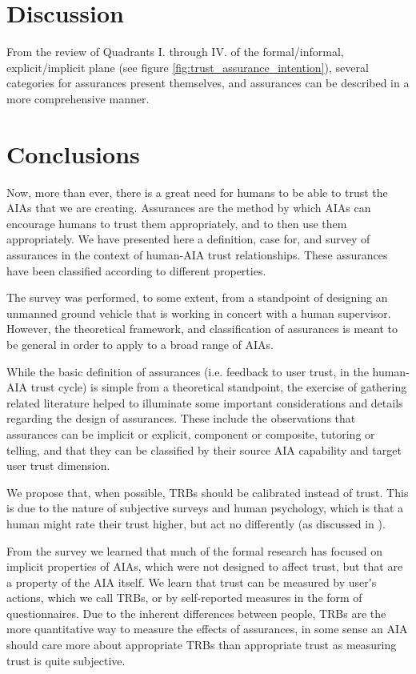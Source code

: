 \section{Discussion}\label{sec:discussion} 
    From the review of Quadrants I. through IV. of the formal/informal, explicit/implicit plane (see figure \ref{fig:trust_assurance_intention}), several categories for assurances present themselves, and assurances can be described in a more comprehensive manner.

    
    

\section{Conclusions}\label{sec:conclusions}
    Now, more than ever, there is a great need for humans to be able to trust the AIAs that we are creating. Assurances are the method by which AIAs can encourage humans to trust them appropriately, and to then use them appropriately. We have presented here a definition, case for, and survey of assurances in the context of human-AIA trust relationships. These assurances have been classified according to different properties.
    
    The survey was performed, to some extent, from a standpoint of designing an unmanned ground vehicle that is working in concert with a human supervisor. However, the theoretical framework, and classification of assurances is meant to be general in order to apply to a broad range of AIAs.

    While the basic definition of assurances (i.e. feedback to user trust, in the human-AIA trust cycle) is simple from a theoretical standpoint, the exercise of gathering related literature helped to illuminate some important considerations and details regarding the design of assurances. These include the observations that assurances can be implicit or explicit, component or composite, tutoring or telling, and that they can be classified by their source AIA capability and target user trust dimension.

    We propose that, when possible, TRBs should be calibrated instead of trust. This is due to the nature of subjective surveys and human psychology, which is that a human might rate their trust higher, but act no differently (as discussed in \cite{Dzindolet2003-ts}). 

    From the survey we learned that much of the formal research has focused on implicit properties of AIAs, which were not designed to affect trust, but that are a property of the AIA itself. We learn that trust can be measured by user's actions, which we call TRBs, or by self-reported measures in the form of questionnaires. Due to the inherent differences between people, TRBs are the more quantitative way to measure the effects of assurances, in some sense an AIA should care more about appropriate TRBs than appropriate trust as measuring trust is quite subjective.


